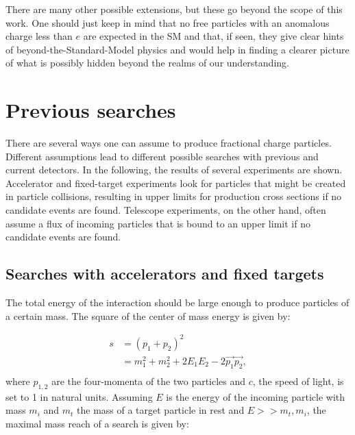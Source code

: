 \noindent There are many other possible extensions, but these go beyond the scope of this work. One should just keep in mind that no free particles with an anomalous charge less than $e$ are expected in the SM and that, if seen, they give clear hints of beyond-the-Standard-Model physics and would help in finding a clearer picture of what is possibly hidden beyond the realms of our understanding.





\section{Previous searches}
\label{sec:prevsearches}
There are several ways one can assume to produce fractional charge particles. Different assumptions lead to different possible searches with previous and current detectors. In the following, the results of several experiments are shown. Accelerator and fixed-target experiments look for particles that might be created in particle collisions, resulting in upper limits for production cross sections if no candidate events are found. Telescope experiments, on the other hand, often assume a flux of incoming particles that is bound to an upper limit if no candidate events are found.

\subsection{Searches with accelerators and fixed targets}
The total energy of the interaction should be large enough to produce particles of a certain mass. The square of the center of mass energy is given by:

\begin{equation}
\label{eq:totalenergy}
\begin{split}
s &= \left(p_1 + p_2\right)^2\\
&= m_1^2 + m_2^2 + 2E_1E_2 - 2\vec{p_1}\vec{p_2},\\
\end{split}
\end{equation}
where $p_{1,2}$ are the four-momenta of the two particles and $c$, the speed of light, is set to 1 in natural units.
Assuming $E$ is the energy of the incoming particle with mass $m_i$ and $m_t$ the mass of a target particle in rest and $E >> m_t, m_i$, the maximal mass reach of a search is given by:

